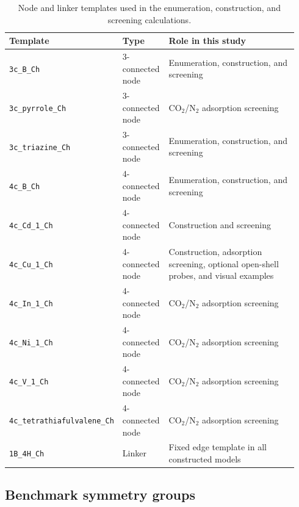 \documentclass[a5paper, 10pt]{article}
\begin{document}
\begin{table}[H]
\centering
\scriptsize
\setlength{\tabcolsep}{1.2mm}
\renewcommand{\arraystretch}{1.15}
\caption{Node and linker templates used in the enumeration, construction, and screening calculations.}
\label{tab:building_units}
\begin{tabular}{@{}p{0.32\linewidth}p{0.16\linewidth}p{0.46\linewidth}@{}}
\toprule
\textbf{Template} & \textbf{Type} & \textbf{Role in this study} \\
\midrule
\texttt{3c\_B\_Ch} & 3-connected node & Enumeration, construction, and screening \\
\texttt{3c\_pyrrole\_Ch} & 3-connected node & CO$_2$/N$_2$ adsorption screening \\
\texttt{3c\_triazine\_Ch} & 3-connected node & Enumeration, construction, and screening \\
\texttt{4c\_B\_Ch} & 4-connected node & Enumeration, construction, and screening \\
\texttt{4c\_Cd\_1\_Ch} & 4-connected node & Construction and screening \\
\texttt{4c\_Cu\_1\_Ch} & 4-connected node & Construction, adsorption screening, optional open-shell probes, and visual examples \\
\texttt{4c\_In\_1\_Ch} & 4-connected node & CO$_2$/N$_2$ adsorption screening \\
\texttt{4c\_Ni\_1\_Ch} & 4-connected node & CO$_2$/N$_2$ adsorption screening \\
\texttt{4c\_V\_1\_Ch} & 4-connected node & CO$_2$/N$_2$ adsorption screening \\
\texttt{4c\_tetrathiafulvalene\_Ch} & 4-connected node & CO$_2$/N$_2$ adsorption screening \\
\texttt{1B\_4H\_Ch} & Linker & Fixed edge template in all constructed models \\
\bottomrule
\end{tabular}
\end{table}

\subsection{Benchmark symmetry groups}
\label{app:benchmark_symmetry}
\end{document}
